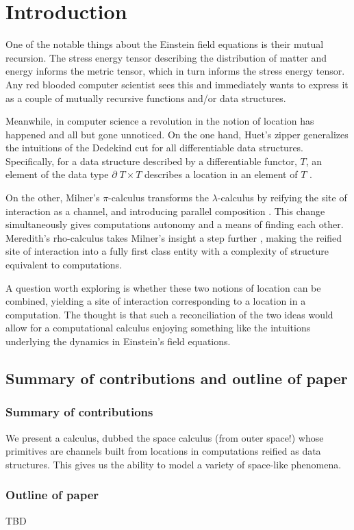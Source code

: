 \section{Introduction}\label{sec:introduction} %

One of the notable things about the Einstein field equations
\cite{Misner1973} is their mutual recursion. The stress energy tensor
describing the distribution of matter and energy informs the metric
tensor, which in turn informs the stress energy tensor. Any red
blooded computer scientist sees this and immediately wants to express
it as a couple of mutually recursive functions and/or data structures.

Meanwhile, in computer science a revolution in the notion of location
has happened and all but gone unnoticed. On the one hand, Huet's
zipper \cite{DBLP:journals/jfp/Huet97} generalizes the intuitions of
the Dedekind cut for all differentiable data structures. Specifically,
for a data structure described by a differentiable functor, $T$, an
element of the data type $\partial \; T \times T$ describes a location
in an element of $T$ \cite{DBLP:conf/popl/McBride08}.

On the other, Milner's $\pi$-calculus transforms the
$\lambda$-calculus by reifying the site of interaction as a channel,
and introducing parallel composition \cite{milner91polyadicpi}. This
change simultaneously gives computations autonomy and a means of
finding each other. Meredith's rho-calculus takes Milner's insight a
step further \cite{DBLP:journals/entcs/MeredithR05}, making the
reified site of interaction into a fully first class entity with a
complexity of structure equivalent to computations.

A question worth exploring is whether these two notions of location
can be combined, yielding a site of interaction corresponding to a
location in a computation. The thought is that such a reconciliation
of the two ideas would allow for a computational calculus enjoying
something like the intuitions underlying the dynamics in Einstein's
field equations.

\subsection{Summary of contributions and outline of paper}

\subsubsection{Summary of contributions}
We present a calculus, dubbed the space calculus (from outer space!)
whose primitives are channels built from locations in computations
reified as data structures. This gives us the ability to model a
variety of space-like phenomena.

\subsubsection{Outline of paper}
TBD

